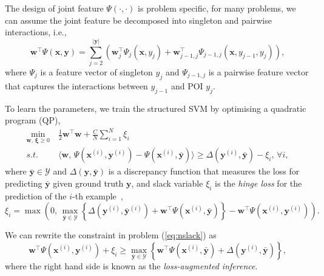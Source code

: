 The design of joint feature $\Psi(\cdot,\cdot)$ is problem specific, 
for many problems, we can assume the joint feature be decomposed into singleton and pairwise interactions, i.e.,
\begin{equation*}
\label{eq:jointfeature}
\mathbf{w}^\top \Psi(\mathbf{x}, \mathbf{y}) 
= \sum_{j=2}^{| \mathbf{y} |} 
  \left( \mathbf{w}_j^\top \Psi_j(\mathbf{x}, y_j) + 
  \mathbf{w}_{j-1,j}^\top \Psi_{j-1, j}(\mathbf{x}, y_{j-1}, y_j) \right),
\end{equation*}
where $\Psi_j$ is a feature vector of singleton $y_j$ 
and $\Psi_{j-1,j}$ is a pairwise feature vector that captures the interactions between $y_{j-1}$ and POI $y_j$.

To learn the parameters, we train the structured SVM by optimising a quadratic program (QP),
\begin{equation}
\label{eq:nslack}
\begin{aligned}
\min_{\mathbf{w}, \, \bm{\xi} \ge 0} ~& \frac{1}{2} \mathbf{w}^\top \mathbf{w} + \frac{C}{N} \sum_{i=1}^N \xi_i \\
s.t.~ ~& \langle \mathbf{w}, \, \Psi(\mathbf{x}^{(i)}, \mathbf{y}^{(i)}) - \Psi(\mathbf{x}^{(i)}, \bar{\mathbf{y}}) \rangle \ge 
       \Delta(\mathbf{y}^{(i)}, \bar{\mathbf{y}}) - \xi_i, \, \forall i,
\end{aligned}
\end{equation}
where $\bar{\mathbf{y}} \in \mathcal{Y}$ and $\Delta(\mathbf{y}, \bar{\mathbf{y}})$ is a discrepancy function that measures the loss 
for predicting $\bar{\mathbf{y}}$ given ground truth $\mathbf{y}$, 
and slack variable $\xi_i$ is the \emph{hinge loss} for the prediction of the $i$-th example~\cite{tsochantaridis2005large},
\begin{equation*}
\xi_i = \max \left( 0, \,
        \max_{\bar{\mathbf{y}} \in \mathcal{Y}} 
        \left\{ \Delta(\mathbf{y}^{(i)}, \bar{\mathbf{y}}^{(i)}) + \mathbf{w}^\top \Psi(\mathbf{x}^{(i)}, \bar{\mathbf{y}}) \right\} -
        \mathbf{w}^\top \Psi(\mathbf{x}^{(i)}, \mathbf{y}^{(i)}) \right).
\end{equation*}

We can rewrite the constraint in problem (\ref{eq:nslack}) as
\begin{equation}
\label{eq:ssvminf}
\mathbf{w}^\top \Psi(\mathbf{x}^{(i)}, \mathbf{y}^{(i)}) + \xi_i \ge
          \max_{\bar{\mathbf{y}} \in \mathcal{Y}}
          \left\{\mathbf{w}^\top \Psi(\mathbf{x}^{(i)}, \bar{\mathbf{y}}) + \Delta(\mathbf{y}^{(i)}, \bar{\mathbf{y}}) \right\},
\end{equation}
where the right hand side is known as the \emph{loss-augmented inference}.

